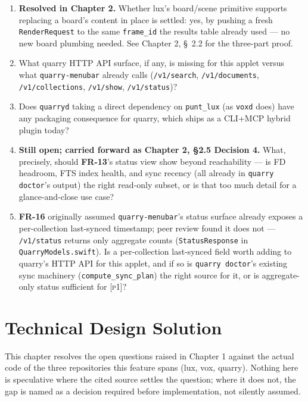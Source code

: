 \documentclass[a4paper,11pt]{report}
\newcommand{\fr}[1]{\textbf{FR-#1}}
\newcommand{\pone}{\textsc{[p1]}}
\begin{document}
\begin{enumerate}
  \item \textbf{Resolved in Chapter 2.} Whether lux's board/scene
    primitive supports replacing a board's content in place is settled:
    yes, by pushing a fresh \texttt{RenderRequest} to the same
    \texttt{frame\_id} the results table already used --- no new board
    plumbing needed. See Chapter 2, \S\ 2.2 for the three-part proof.
  \item What quarry HTTP API surface, if any, is missing for this applet
    versus what \texttt{quarry-menubar} already calls
    (\texttt{/v1/search}, \texttt{/v1/documents}, \texttt{/v1/collections},
    \texttt{/v1/show}, \texttt{/v1/status})?
  \item Does \texttt{quarryd} taking a direct dependency on
    \texttt{punt\_lux} (as \texttt{voxd} does) have any packaging
    consequence for quarry, which ships as a CLI+MCP hybrid plugin today?
  \item \textbf{Still open; carried forward as Chapter 2, \S2.5 Decision
    4.} What, precisely, should \fr{13}'s status view show beyond
    reachability --- is FD headroom, FTS index health, and sync recency
    (all already in \texttt{quarry doctor}'s output) the right read-only
    subset, or is that too much detail for a glance-and-close use case?
  \item \label{sec:openq-lastsync} \fr{16} originally assumed
    \texttt{quarry-menubar}'s status surface already exposes a
    per-collection last-synced timestamp; peer review found it does not
    --- \texttt{/v1/status} returns only aggregate counts
    (\texttt{StatusResponse} in \texttt{QuarryModels.swift}). Is a
    per-collection last-synced field worth adding to quarry's HTTP API
    for this applet, and if so is \texttt{quarry doctor}'s existing sync
    machinery (\texttt{compute\_sync\_plan}) the right source for it, or
    is aggregate-only status sufficient for \pone{}?
\end{enumerate}

\chapter{Technical Design Solution}

This chapter resolves the open questions raised in Chapter 1 against the
actual code of the three repositories this feature spans (lux, vox,
quarry). Nothing here is speculative where the cited source settles the
question; where it does not, the gap is named as a decision required
before implementation, not silently assumed.
\end{document}
